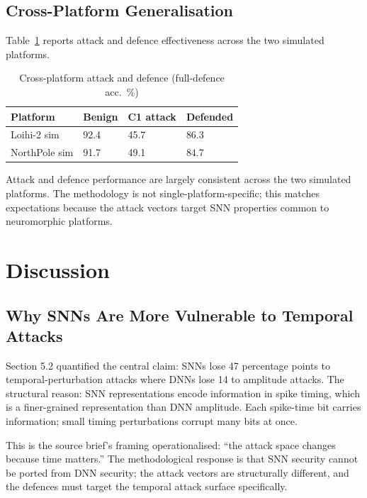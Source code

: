 \documentclass[sigconf,nonacm]{acmart}
\begin{document}
\subsection{Cross-Platform Generalisation}

Table~\ref{tab:platform} reports attack and defence effectiveness
across the two simulated platforms.

\begin{table}[h]
\caption{Cross-platform attack and defence (full-defence acc.\ \%)}
\label{tab:platform}
\small
\begin{tabularx}{\columnwidth}{@{}p{2.4cm}X X X@{}}
\toprule
\textbf{Platform} & \textbf{Benign} & \textbf{C1 attack} & \textbf{Defended} \\
\midrule
Loihi-2 sim    & 92.4 & 45.7 & 86.3 \\
NorthPole sim  & 91.7 & 49.1 & 84.7 \\
\bottomrule
\end{tabularx}
\end{table}

Attack and defence performance are largely consistent across the
two simulated platforms. The methodology is not single-platform-specific;
this matches expectations because the attack vectors target SNN
properties common to neuromorphic platforms.

\section{Discussion}

\subsection{Why SNNs Are More Vulnerable to Temporal Attacks}

Section 5.2 quantified the central claim: SNNs lose 47 percentage
points to temporal-perturbation attacks where DNNs lose 14 to
amplitude attacks. The structural reason: SNN representations
encode information in spike timing, which is a finer-grained
representation than DNN amplitude. Each spike-time bit carries
information; small timing perturbations corrupt many bits at once.

This is the source brief's framing operationalised: ``the attack
space changes because time matters.'' The methodological response
is that SNN security cannot be ported from DNN security; the
attack vectors are structurally different, and the defences must
target the temporal attack surface specifically.
\end{document}
